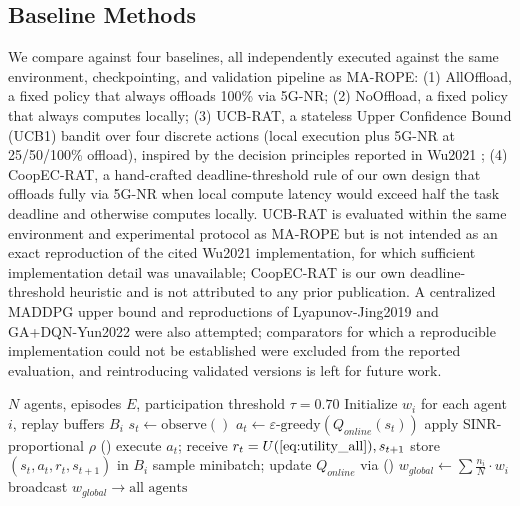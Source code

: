 \documentclass[journal,10pt,twocolumn]{IEEEtran}
\begin{document}
\subsection{Baseline Methods}

We compare against four baselines, all independently executed against the same environment, checkpointing, and validation pipeline as MA-ROPE: (1) AllOffload, a fixed policy that always offloads 100\% via 5G-NR; (2) NoOffload, a fixed policy that always computes locally; (3) UCB-RAT, a stateless Upper Confidence Bound (UCB1) bandit over four discrete actions (local execution plus 5G-NR at 25/50/100\% offload), inspired by the decision principles reported in Wu2021 \cite{wu2021}; (4) CoopEC-RAT, a hand-crafted deadline-threshold rule of our own design that offloads fully via 5G-NR when local compute latency would exceed half the task deadline and otherwise computes locally. UCB-RAT is evaluated within the same environment and experimental protocol as MA-ROPE but is not intended as an exact reproduction of the cited Wu2021 implementation, for which sufficient implementation detail was unavailable; CoopEC-RAT is our own deadline-threshold heuristic and is not attributed to any prior publication. A centralized MADDPG \cite{lowe2017} upper bound and reproductions of Lyapunov-Jing2019 \cite{jing2019} and GA+DQN-Yun2022 \cite{yun2022} were also attempted; comparators for which a reproducible implementation could not be established were excluded from the reported evaluation, and reintroducing validated versions is left for future work.



\begin{algorithm}[t]
\caption{MA-ROPE Training with FedAvg}
\label{alg:ma_rope}
\begin{algorithmic}[1]
\REQUIRE $N$ agents, episodes $E$, participation threshold $\tau=0.70$
\STATE Initialize $w_i$ for each agent $i$, replay buffers $B_i$
        \STATE $s_t \leftarrow \text{observe}()$ 
        \STATE $a_t \leftarrow \varepsilon\text{-greedy}(Q_{online}(s_t))$
        \STATE apply SINR-proportional $\rho$ ()
        \STATE execute $a_t$; receive $r_t = U (\text{\Cref{eq:utility_all}}), s_{t+1}$
        \STATE store $(s_t, a_t, r_t, s_{t+1})$ in $B_i$
        \STATE sample minibatch; update $Q_{online}$ via ()
    \ENDFOR
        \STATE $w_{global} \leftarrow \sum \frac{n_i}{N} \cdot w_i$ 
        \STATE broadcast $w_{global} \rightarrow \text{all agents}$
    \ENDIF
\ENDFOR
\end{algorithmic}
\end{algorithm}
\end{document}
